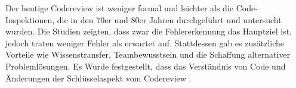 
Der heutige Codereview ist weniger formal und leichter als die Code-Inspektionen, die in den 70er und 80er Jahren durchgeführt und untersucht wurden. Die Studien zeigten, dass zwar die Fehlererkennung das Hauptziel ist, jedoch traten weniger Fehler als erwartet auf. Stattdessen gab es zusätzliche Vorteile wie Wissenstransfer, Teambewusstsein und die Schaffung alternativer Problemlösungen. Es Wurde festgestellt, dass das Verständnis von Code und Änderungen der Schlüsselaspekt vom Codereview \cite{bacchelli2013expectations}.

